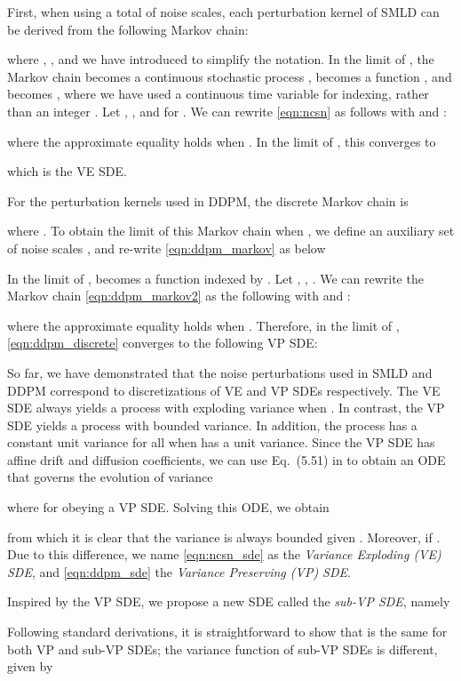 \documentclass{article} \usepackage{iclr2021_conference,times}
\begin{document}
First, when using a total of  noise scales, each perturbation kernel  of SMLD can be derived from the following Markov chain:

where , , and we have introduced  to simplify the notation.
In the limit of , the Markov chain  becomes a continuous stochastic process ,  becomes a function , and  becomes , where we have used a continuous time variable  for indexing, rather than an integer . 
Let , , and  for . We can rewrite \cref{eqn:ncsn} as follows with  and :

where the approximate equality holds when . 
In the limit of , this converges to

which is the VE SDE. 

For the perturbation kernels  used in DDPM, the discrete Markov chain is

where . To obtain the limit of this Markov chain when , we define an auxiliary set of noise scales , and re-write \cref{eqn:ddpm_markov} as below

In the limit of ,  becomes a function  indexed by . Let , , . We can rewrite the Markov chain \cref{eqn:ddpm_markov2} as the following with  and :

where the approximate equality holds when .
Therefore, in the limit of , \cref{eqn:ddpm_discrete} converges to the following VP SDE:


So far, we have demonstrated that the noise perturbations used in SMLD and DDPM correspond to discretizations of VE and VP SDEs respectively. The VE SDE always yields a process with exploding variance when . In contrast, the VP SDE yields a process with bounded variance. In addition, the process has a constant unit variance for all  when  has a unit variance. Since the VP SDE has affine drift and diffusion coefficients, we can use Eq.~(5.51) in \citet{sarkka2019applied} to obtain an ODE that governs the evolution of variance

where  for  obeying a VP SDE. Solving this ODE, we obtain

from which it is clear that the variance  is always bounded given . Moreover,  if . Due to this difference, we name \cref{eqn:ncsn_sde} as the \emph{Variance Exploding (VE) SDE}, and \cref{eqn:ddpm_sde} the \emph{Variance Preserving (VP) SDE}.

Inspired by the VP SDE, we propose a new SDE called the \emph{sub-VP SDE}, namely

Following standard derivations, it is straightforward to show that  is the same for both VP and sub-VP SDEs; the variance function of sub-VP SDEs is different, given by
\end{document}
